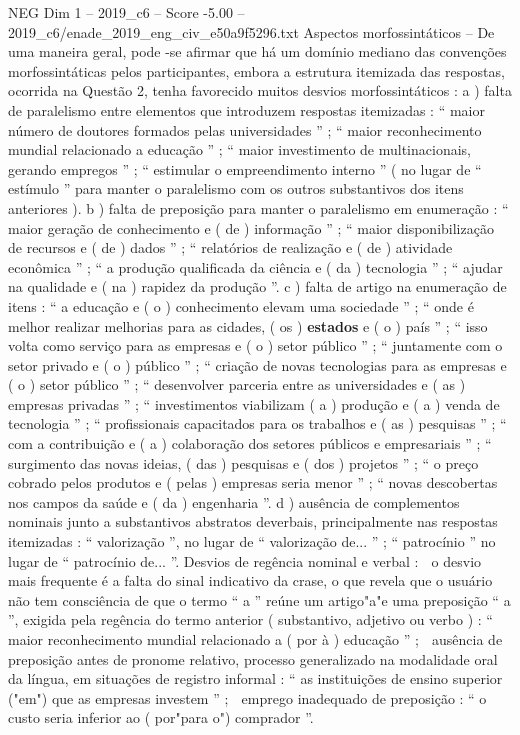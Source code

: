 \begin{textsample}{NEG Dim 1 – 2019\_c6 – Score -5.00 – 2019\_c6/enade\_2019\_eng\_civ\_e50a9f5296.txt}
Aspectos morfossintáticos – De uma maneira geral, pode -se afirmar que há um domínio mediano das convenções morfossintáticas pelos participantes, embora a estrutura itemizada das respostas, ocorrida na Questão 2, tenha favorecido muitos desvios morfossintáticos : a ) falta de paralelismo entre elementos que introduzem respostas itemizadas : “ maior número de doutores formados pelas universidades ” ; “ maior reconhecimento mundial relacionado a educação ” ; “ maior investimento de multinacionais, gerando empregos ” ; “ estimular o empreendimento interno ” ( no lugar de “ estímulo ” para manter o paralelismo com os outros substantivos dos itens anteriores ). b ) falta de preposição para manter o paralelismo em enumeração : “ maior geração de conhecimento e ( de ) informação ” ; “ maior disponibilização de recursos e ( de ) dados ” ; “ relatórios de realização e ( de ) atividade econômica ” ; “ a produção qualificada da ciência e ( da ) tecnologia ” ; “ ajudar na qualidade e ( na ) rapidez da produção ”. c ) falta de artigo na enumeração de itens : “ a educação e ( o ) conhecimento elevam uma sociedade ” ; “ onde é melhor realizar melhorias para as cidades, ( os ) \textbf{estados} e ( o ) país ” ; “ isso volta como serviço para as empresas e ( o ) setor público ” ; “ juntamente com o setor privado e ( o ) público ” ; “ criação de novas tecnologias para as empresas e ( o ) setor público ” ; “ desenvolver parceria entre as universidades e ( as ) empresas privadas ” ; “ investimentos viabilizam ( a ) produção e ( a ) venda de tecnologia ” ; “ profissionais capacitados para os trabalhos e ( as ) pesquisas ” ; “ com a contribuição e ( a ) colaboração dos setores públicos e empresariais ” ; “ surgimento das novas ideias, ( das ) pesquisas e ( dos ) projetos ” ; “ o preço cobrado pelos produtos e ( pelas ) empresas seria menor ” ; “ novas descobertas nos campos da saúde e ( da ) engenharia ”. d ) ausência de complementos nominais junto a substantivos abstratos deverbais, principalmente nas respostas itemizadas : “ valorização ”, no lugar de “ valorização de... ” ; “ patrocínio ” no lugar de “ patrocínio de... ”.
Desvios de regência nominal e verbal :  o desvio mais frequente é a falta do sinal indicativo da crase, o que revela que o usuário não tem consciência de que o termo “ a ” reúne um artigo"a"e uma preposição “ a ”, exigida pela regência do termo anterior ( substantivo, adjetivo ou verbo ) : “ maior reconhecimento mundial relacionado a ( por à ) educação ” ;  ausência de preposição antes de pronome relativo, processo generalizado na modalidade oral da língua, em situações de registro informal : “ as instituições de ensino superior ("em") que as empresas investem ” ;  emprego inadequado de preposição : “ o custo seria inferior ao ( por"para o") comprador ”.

\end{textsample}
